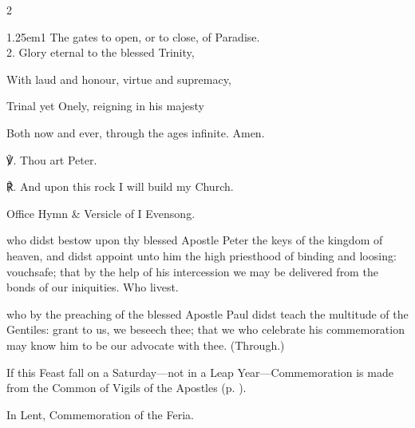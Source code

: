 \begin{paracol}{2}
\begin{hangparas}{1.25em}{1}
The gates to open, or to close, of Paradise.\\

2. Glory eternal to the blessed Trinity,

With laud and honour, virtue and supremacy,

Trinal yet Onely, reigning in his majesty

Both now and ever, through the ages infinite. Amen.\\
\end{hangparas}

    ℣. Thou art Peter.

	℟. And upon this rock I will build my Church.
	

\fussy	
\end{paracol}

\secondEvensong
{}

\begin{rubric}
	Office Hymn \& Versicle of I Evensong.
\end{rubric}



\collect
{} who didst bestow upon thy blessed Apostle Peter the keys of the kingdom of heaven, and didst appoint unto him the high priesthood of binding and loosing: vouchsafe; that by the help of his intercession we may be delivered from the bonds of our iniquities. Who livest.

 who by the preaching of the blessed Apostle Paul didst teach the multitude of the Gentiles: grant to us, we beseech thee; that we who celebrate his commemoration may know him to be our advocate with thee. (Through.)

\begin{rubric}
    If this Feast fall on a Saturday---not in a Leap Year---Commemoration is made  from the Common of Vigils of the Apostles (p. \pageref{CommonVigilApostles}).
\end{rubric}

\begin{rubric}
    In Lent, Commemoration of the Feria.
\end{rubric}


